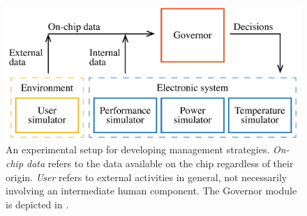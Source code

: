 \begin{figure}
  \centering
  \includegraphics[width=1.0\columnwidth]{include/assets/figures/developer.pdf}

  \caption{An experimental setup for developing management strategies.
  \emph{On-chip data} refers to the data available on the chip regardless of
  their origin. \emph{User} refers to external activities in general, not
  necessarily involving an intermediate human component. The Governor module is
  depicted in .}

\end{figure}
